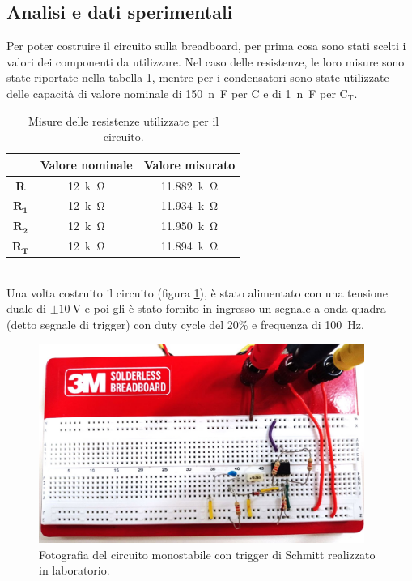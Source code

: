 \documentclass{report}
\begin{document}
\subsection{Analisi e dati sperimentali}
Per poter costruire il circuito sulla breadboard, per prima cosa sono stati scelti i valori dei componenti da utilizzare. Nel caso delle resistenze, le loro misure sono state riportate nella tabella \ref{table:mis_res1}, mentre per i condensatori sono state utilizzate delle capacità di valore nominale di \SI{150}{n\farad} per C e di \SI{1}{n\farad} per $\mathrm{C_T}$.
\begin{table}[h!]
	\centering
	\begin{tabular}{|c|c|c|}
		\cline{2-3} 
		\multicolumn{1}{c|}{} & \textbf{Valore nominale} & \textbf{Valore misurato}\\ 
		\hline
		$\mathbf{R}$ & \SI{12}{k\ohm} & \SI{11.882}{k\ohm} \\ 
		\hline
		$\mathbf{R_1}$ & \SI{12}{k\ohm} & \SI{11.934}{k\ohm} \\ 
		\hline
		$\mathbf{R_2}$ & \SI{12}{k\ohm} & \SI{11.950}{k\ohm} \\ 
		\hline
		$\mathbf{R_T}$ & \SI{12}{k\ohm} & \SI{11.894}{k\ohm} \\ 
		\hline
	\end{tabular}
	\caption{Misure delle resistenze utilizzate per il circuito.}
	\label{table:mis_res1}
\end{table}
\\Una volta costruito il circuito (figura \ref{figura:circuito1}), è stato alimentato con una tensione duale di $\mathrm{\pm\SI{10}{\volt}}$ e poi gli è stato fornito in ingresso un segnale a onda quadra (detto segnale di trigger) con duty cycle del 20\% e frequenza di \SI{100}{\hertz}.
\begin{figure}[h]
	\centering
	\includegraphics[height=6.5cm]{immagini/circuito1}
	\caption{Fotografia del circuito monostabile con trigger di Schmitt realizzato in laboratorio.}
	\label{figura:circuito1}
\end{figure}
\end{document}
